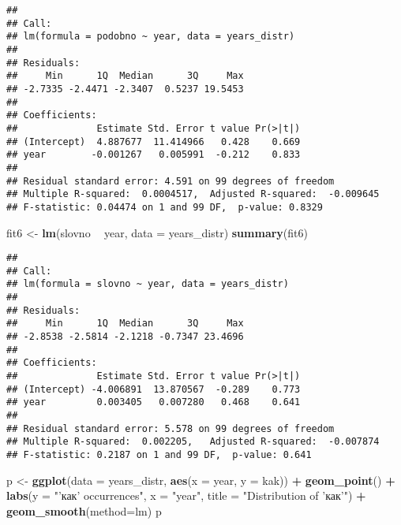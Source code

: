 \documentclass[
]{article}
\newenvironment{Shaded}{\begin{snugshade}}{\end{snugshade}}
\newcommand{\DataTypeTok}[1]{\textcolor[rgb]{0.13,0.29,0.53}{#1}}
\newcommand{\KeywordTok}[1]{\textcolor[rgb]{0.13,0.29,0.53}{\textbf{#1}}}
\newcommand{\NormalTok}[1]{#1}
\newcommand{\OperatorTok}[1]{\textcolor[rgb]{0.81,0.36,0.00}{\textbf{#1}}}
\newcommand{\StringTok}[1]{\textcolor[rgb]{0.31,0.60,0.02}{#1}}
\begin{document}
\begin{verbatim}
## 
## Call:
## lm(formula = podobno ~ year, data = years_distr)
## 
## Residuals:
##     Min      1Q  Median      3Q     Max 
## -2.7335 -2.4471 -2.3407  0.5237 19.5453 
## 
## Coefficients:
##              Estimate Std. Error t value Pr(>|t|)
## (Intercept)  4.887677  11.414966   0.428    0.669
## year        -0.001267   0.005991  -0.212    0.833
## 
## Residual standard error: 4.591 on 99 degrees of freedom
## Multiple R-squared:  0.0004517,  Adjusted R-squared:  -0.009645 
## F-statistic: 0.04474 on 1 and 99 DF,  p-value: 0.8329
\end{verbatim}

\begin{Shaded}
\begin{Highlighting}[]
\NormalTok{fit6 <-}\StringTok{ }\KeywordTok{lm}\NormalTok{(slovno }\OperatorTok{~}\StringTok{ }\NormalTok{year, }\DataTypeTok{data =}\NormalTok{ years_distr)}
\KeywordTok{summary}\NormalTok{(fit6)}
\end{Highlighting}
\end{Shaded}

\begin{verbatim}
## 
## Call:
## lm(formula = slovno ~ year, data = years_distr)
## 
## Residuals:
##     Min      1Q  Median      3Q     Max 
## -2.8538 -2.5814 -2.1218 -0.7347 23.4696 
## 
## Coefficients:
##              Estimate Std. Error t value Pr(>|t|)
## (Intercept) -4.006891  13.870567  -0.289    0.773
## year         0.003405   0.007280   0.468    0.641
## 
## Residual standard error: 5.578 on 99 degrees of freedom
## Multiple R-squared:  0.002205,   Adjusted R-squared:  -0.007874 
## F-statistic: 0.2187 on 1 and 99 DF,  p-value: 0.641
\end{verbatim}

\begin{Shaded}
\begin{Highlighting}[]
\NormalTok{p <-}\StringTok{ }\KeywordTok{ggplot}\NormalTok{(}\DataTypeTok{data =}\NormalTok{ years_distr, }\KeywordTok{aes}\NormalTok{(}\DataTypeTok{x =}\NormalTok{ year, }\DataTypeTok{y =}\NormalTok{ kak)) }\OperatorTok{+}\StringTok{ }
\StringTok{  }\KeywordTok{geom_point}\NormalTok{() }\OperatorTok{+}
\StringTok{  }\KeywordTok{labs}\NormalTok{(}\DataTypeTok{y =} \StringTok{"'как' occurrences"}\NormalTok{,}
       \DataTypeTok{x =} \StringTok{"year"}\NormalTok{,}
       \DataTypeTok{title =} \StringTok{"Distribution of 'как'"}\NormalTok{) }\OperatorTok{+}
\StringTok{  }\KeywordTok{geom_smooth}\NormalTok{(}\DataTypeTok{method=}\NormalTok{lm)}
\NormalTok{p}
\end{Highlighting}
\end{Shaded}
\end{document}
